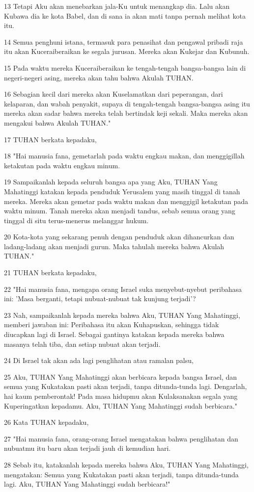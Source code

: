 \par 13 Tetapi Aku akan menebarkan jala-Ku untuk menangkap dia. Lalu akan Kubawa dia ke kota Babel, dan di sana ia akan mati tanpa pernah melihat kota itu.
\par 14 Semua penghuni istana, termasuk para penasihat dan pengawal pribadi raja itu akan Kuceraiberaikan ke segala jurusan. Mereka akan Kukejar dan Kubunuh.
\par 15 Pada waktu mereka Kuceraiberaikan ke tengah-tengah bangsa-bangsa lain di negeri-negeri asing, mereka akan tahu bahwa Akulah TUHAN.
\par 16 Sebagian kecil dari mereka akan Kuselamatkan dari peperangan, dari kelaparan, dan wabah penyakit, supaya di tengah-tengah bangsa-bangsa asing itu mereka akan sadar bahwa mereka telah bertindak keji sekali. Maka mereka akan mengakui bahwa Akulah TUHAN."
\par 17 TUHAN berkata kepadaku,
\par 18 "Hai manusia fana, gemetarlah pada waktu engkau makan, dan menggigillah ketakutan pada waktu engkau minum.
\par 19 Sampaikanlah kepada seluruh bangsa apa yang Aku, TUHAN Yang Mahatinggi katakan kepada penduduk Yerusalem yang masih tinggal di tanah mereka. Mereka akan gemetar pada waktu makan dan menggigil ketakutan pada waktu minum. Tanah mereka akan menjadi tandus, sebab semua orang yang tinggal di situ terus-menerus melanggar hukum.
\par 20 Kota-kota yang sekarang penuh dengan penduduk akan dihancurkan dan ladang-ladang akan menjadi gurun. Maka tahulah mereka bahwa Akulah TUHAN."
\par 21 TUHAN berkata kepadaku,
\par 22 "Hai manusia fana, mengapa orang Israel suka menyebut-nyebut peribahasa ini: 'Masa berganti, tetapi nubuat-nubuat tak kunjung terjadi'?
\par 23 Nah, sampaikanlah kepada mereka bahwa Aku, TUHAN Yang Mahatinggi, memberi jawaban ini: Peribahasa itu akan Kuhapuskan, sehingga tidak diucapkan lagi di Israel. Sebagai gantinya katakan kepada mereka bahwa masanya telah tiba, dan setiap nubuat akan terjadi.
\par 24 Di Israel tak akan ada lagi penglihatan atau ramalan palsu,
\par 25 Aku, TUHAN Yang Mahatinggi akan berbicara kepada bangsa Israel, dan semua yang Kukatakan pasti akan terjadi, tanpa ditunda-tunda lagi. Dengarlah, hai kaum pemberontak! Pada masa hidupmu akan Kulaksanakan segala yang Kuperingatkan kepadamu. Aku, TUHAN Yang Mahatinggi sudah berbicara."
\par 26 Kata TUHAN kepadaku,
\par 27 "Hai manusia fana, orang-orang Israel mengatakan bahwa penglihatan dan nubuatmu itu baru akan terjadi jauh di kemudian hari.
\par 28 Sebab itu, katakanlah kepada mereka bahwa Aku, TUHAN Yang Mahatinggi, mengatakan: Semua yang Kukatakan pasti akan terjadi, tanpa ditunda-tunda lagi. Aku, TUHAN Yang Mahatinggi sudah berbicara!"

